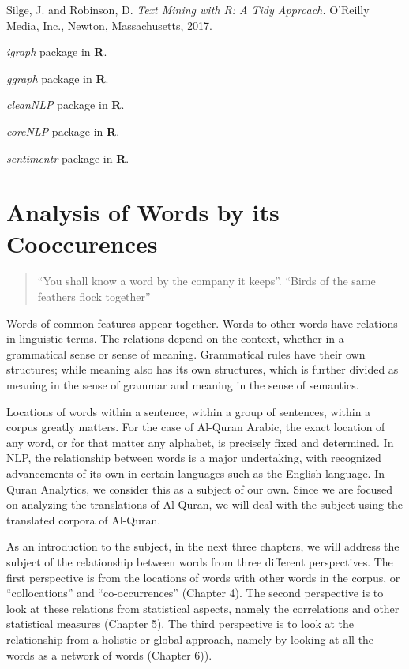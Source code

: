 \documentclass[
]{article}
\begin{document}
Silge, J. and Robinson, D. \emph{Text Mining with R: A Tidy Approach.} O'Reilly Media, Inc., Newton, Massachusetts, 2017. \citep{silge2017}

\emph{igraph} package in \textbf{R}. \citep{igraph}

\emph{ggraph} package in \textbf{R}. \citep{ggraph}

\emph{cleanNLP} package in \textbf{R}. \citep{cleanNLP}

\emph{coreNLP} package in \textbf{R}. \citep{coreNLP}

\emph{sentimentr} package in \textbf{R}. \citep{sentimentr}

\hypertarget{analysis-of-words-by-its-cooccurences}{%
\section*{Analysis of Words by its Cooccurences}\label{analysis-of-words-by-its-cooccurences}}

\begin{quote}
``You shall know a word by the company it keeps''.
``Birds of the same feathers flock together''
\end{quote}

Words of common features appear together. Words to other words have relations in linguistic terms. The relations depend on the context, whether in a grammatical sense or sense of meaning. Grammatical rules have their own structures; while meaning also has its own structures, which is further divided as meaning in the sense of grammar and meaning in the sense of semantics.

Locations of words within a sentence, within a group of sentences, within a corpus greatly matters. For the case of Al-Quran Arabic, the exact location of any word, or for that matter any alphabet, is precisely fixed and determined. In NLP, the relationship between words is a major undertaking, with recognized advancements of its own in certain languages such as the English language. In Quran Analytics, we consider this as a subject of our own. Since we are focused on analyzing the translations of Al-Quran, we will deal with the subject using the translated corpora of Al-Quran.

As an introduction to the subject, in the next three chapters, we will address the subject of the relationship between words from three different perspectives. The first perspective is from the locations of words with other words in the corpus, or ``collocations'' and ``co-occurrences'' (Chapter 4). The second perspective is to look at these relations from statistical aspects, namely the correlations and other statistical measures (Chapter 5). The third perspective is to look at the relationship from a holistic or global approach, namely by looking at all the words as a network of words (Chapter 6)).
\end{document}
